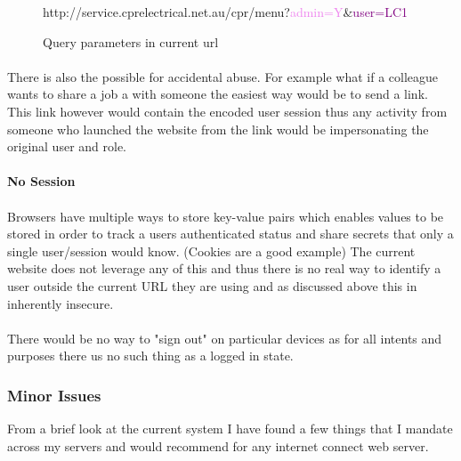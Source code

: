 \begin{figure}[h!]
    \begin{mdframed}
        http://service.cprelectrical.net.au/cpr/menu?\textcolor{violet}{admin=Y}\&\textcolor{purple}{user=LC1}
    \end{mdframed}
    \caption{Query parameters in current url}
    \label{fig:query-parameters-current}
\end{figure}

\paragraph{}
There is also the possible for accidental abuse.
For example what if a colleague wants to share a job a with someone the easiest way would be to send a link.
This link however would contain the encoded user session thus any activity from someone who launched the website from
the link would be impersonating the original user and role.

\paragraph{No Session}
\paragraph{}
Browsers have multiple ways to store key-value pairs which enables values to be stored in order to track a users authenticated status and share
secrets that only a single user/session would know. (Cookies are a good example)
The current website does not leverage any of this and thus there is no real way to identify a user outside the current URL they are using and as discussed
above this in inherently insecure.

\paragraph{}
There would be no way to "sign out" on particular devices as for all intents and purposes there us no such thing as a logged in state.


\subsubsection{Minor Issues}\label{subsubsec:minor-issues}
From a brief look at the current system I have found a few things that I mandate across my servers and would recommend for any internet
connect web server.

